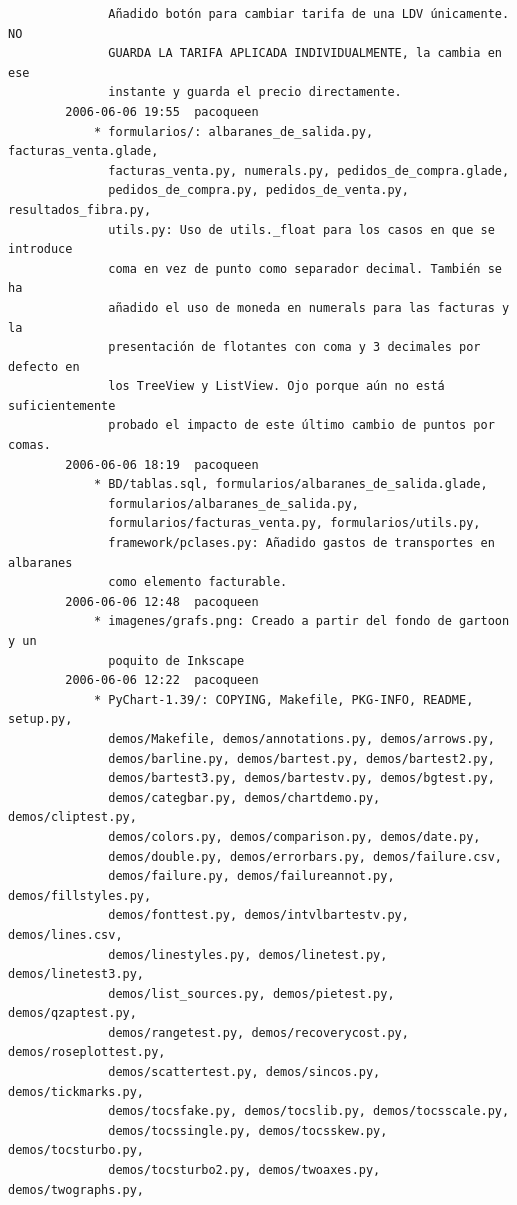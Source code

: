 \documentclass[a4paper]{article}
\begin{document}
\begin{verbatim}
              Añadido botón para cambiar tarifa de una LDV únicamente. NO
              GUARDA LA TARIFA APLICADA INDIVIDUALMENTE, la cambia en ese
              instante y guarda el precio directamente.
        2006-06-06 19:55  pacoqueen
            * formularios/: albaranes_de_salida.py, facturas_venta.glade,
              facturas_venta.py, numerals.py, pedidos_de_compra.glade,
              pedidos_de_compra.py, pedidos_de_venta.py, resultados_fibra.py,
              utils.py: Uso de utils._float para los casos en que se introduce
              coma en vez de punto como separador decimal. También se ha
              añadido el uso de moneda en numerals para las facturas y la
              presentación de flotantes con coma y 3 decimales por defecto en
              los TreeView y ListView. Ojo porque aún no está suficientemente
              probado el impacto de este último cambio de puntos por comas.
        2006-06-06 18:19  pacoqueen
            * BD/tablas.sql, formularios/albaranes_de_salida.glade,
              formularios/albaranes_de_salida.py,
              formularios/facturas_venta.py, formularios/utils.py,
              framework/pclases.py: Añadido gastos de transportes en albaranes
              como elemento facturable.
        2006-06-06 12:48  pacoqueen
            * imagenes/grafs.png: Creado a partir del fondo de gartoon y un
              poquito de Inkscape
        2006-06-06 12:22  pacoqueen
            * PyChart-1.39/: COPYING, Makefile, PKG-INFO, README, setup.py,
              demos/Makefile, demos/annotations.py, demos/arrows.py,
              demos/barline.py, demos/bartest.py, demos/bartest2.py,
              demos/bartest3.py, demos/bartestv.py, demos/bgtest.py,
              demos/categbar.py, demos/chartdemo.py, demos/cliptest.py,
              demos/colors.py, demos/comparison.py, demos/date.py,
              demos/double.py, demos/errorbars.py, demos/failure.csv,
              demos/failure.py, demos/failureannot.py, demos/fillstyles.py,
              demos/fonttest.py, demos/intvlbartestv.py, demos/lines.csv,
              demos/linestyles.py, demos/linetest.py, demos/linetest3.py,
              demos/list_sources.py, demos/pietest.py, demos/qzaptest.py,
              demos/rangetest.py, demos/recoverycost.py, demos/roseplottest.py,
              demos/scattertest.py, demos/sincos.py, demos/tickmarks.py,
              demos/tocsfake.py, demos/tocslib.py, demos/tocsscale.py,
              demos/tocssingle.py, demos/tocsskew.py, demos/tocsturbo.py,
              demos/tocsturbo2.py, demos/twoaxes.py, demos/twographs.py,

\end{verbatim}
\end{document}
